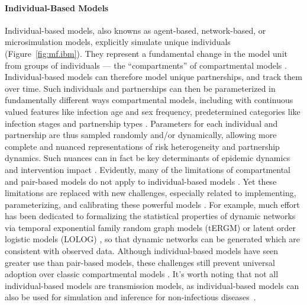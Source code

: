 \paragraph{Individual-Based Models}
Individual-based models, also knowns as agent-based, network-based, or microsimulation models,
explicitly simulate unique individuals (Figure~\ref{fig:mf.ibm}).
They represent a fundamental change in the model unit from groups of individuals
--- \ie the ``compartments'' of compartmental models \cite{Rao2021}.
Individual-based models can therefore model unique partnerships, and track them over time.
Such individuals and partnerships can then be
parameterized in fundamentally different ways \vs compartmental models,
including with continuous valued features like infection age and sex frequency,
\vs predetermined categories like infection stages and partnership types \cite{Pellis2015,Rao2021}.
Parameters for each individual and partnership are thus sampled randomly and/or dynamically,
allowing more complete and nuanced representations of risk heterogeneity and partnership dynamics.
Such nuances can in fact be key determinants of epidemic dynamics and intervention impact
\cite{Hontelez2013,Johnson2016mf}.
Evidently, many of the limitations of compartmental and pair-based models
do not apply to individual-based models \cite{Rao2021}.
Yet these limitations are replaced with new challenges,
especially related to implementing, parameterizing, and calibrating these powerful models
\cite{Rao2021,Pellis2015,Hazelbag2020}.
For example, much effort has been dedicated to
formalizing the statistical properties of dynamic networks
via temporal exponential family random graph models (tERGM) \cite{Jenness2018}
or latent order logistic models (LOLOG) \cite{Clark2022},
so that dynamic networks can be generated which are consistent with observed data.
Although individual-based models have seen greater use than pair-based models,
these challenges still prevent universal adoption over classic compartmental models \cite{Rao2021}.
It's worth noting that not all individual-based models are transmission models,
as individual-based models can also be used for
simulation and inference for non-infectious diseases~\cite{Silverman2021}.
